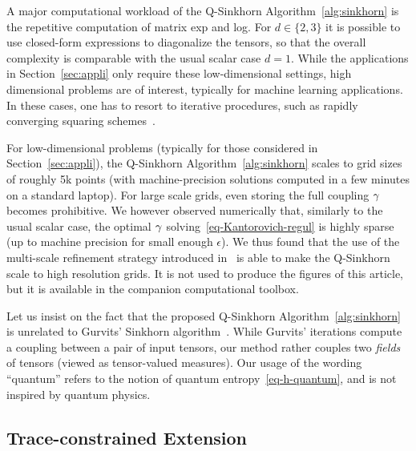 

\begin{rem}
A major computational workload of the Q-Sinkhorn Algorithm~\ref{alg:sinkhorn} is the repetitive computation of matrix exp and log. 
%
For $d \in \{2,3\}$ it is possible to use closed-form expressions to diagonalize the tensors, so that the overall complexity is comparable with the usual scalar case $d=1$.
%
While the applications in Section~\ref{sec:appli} only require these low-dimensional settings, high dimensional problems are of interest, typically for machine learning applications.  In these cases, one has to resort to iterative procedures, such as rapidly converging squaring schemes~\cite{HighamExp,HighamLog}.
\end{rem}

\begin{rem}
For low-dimensional problems (typically for those considered in Section~\ref{sec:appli}), the Q-Sinkhorn Algorithm~\ref{alg:sinkhorn} scales to grid sizes of roughly 5k points (with machine-precision solutions computed in a few minutes on a standard laptop).
%
For large scale grids, even storing the full coupling $\gamma$ becomes prohibitive. We however observed numerically that, similarly  to the usual scalar case, the optimal $\gamma$ solving~\eqref{eq-Kantorovich-regul} is highly sparse (up to machine precision for small enough $\epsilon$).
% 
We thus found that the use of the multi-scale refinement strategy introduced in~\cite{Schmitzer2016} is able to make the Q-Sinkhorn scale to high resolution grids.  It is not used to produce the figures of this article, but it is available in the companion computational toolbox.
\end{rem}

\begin{rem}
Let us insist on the fact that the proposed Q-Sinkhorn Algorithm~\ref{alg:sinkhorn} is unrelated to Gurvits' Sinkhorn algorithm~\cite{gurvits2004classical}. While Gurvits' iterations compute a coupling between a pair of input tensors, our method rather couples two \textit{fields} of tensors (viewed as tensor-valued measures). Our usage of the wording  ``quantum'' refers to the notion of quantum entropy~\eqref{eq-h-quantum}, and is not inspired by quantum physics.
\end{rem}


\subsection{Trace-constrained Extension}

